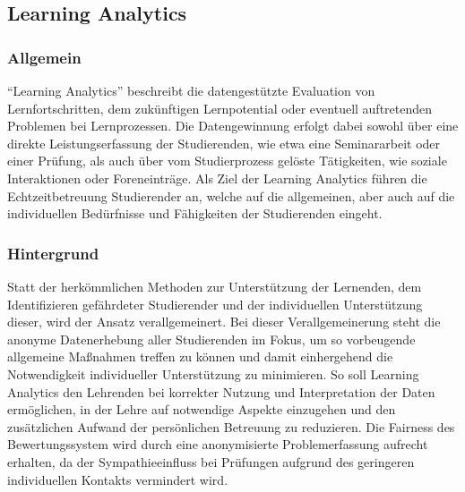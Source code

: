 \subsection{Learning Analytics}

\subsubsection{Allgemein}
\enquote{Learning Analytics} beschreibt die datengestützte Evaluation von Lernfortschritten, dem zukünftigen Lernpotential oder eventuell auftretenden Problemen bei Lernprozessen.
Die Datengewinnung erfolgt dabei sowohl über eine direkte Leistungserfassung der Studierenden, wie etwa eine Seminararbeit oder einer Prüfung, als auch über vom Studierprozess gelöste Tätigkeiten, wie soziale Interaktionen oder Foreneinträge.
Als Ziel der Learning Analytics führen \citeauthor{rf-Johnson2012TheNH} die Echtzeitbetreuung Studierender an, welche auf die allgemeinen, aber auch auf die individuellen Bedürfnisse und Fähigkeiten der Studierenden eingeht.
\autocite{rf-Johnson2012TheNH}

\subsubsection{Hintergrund}
Statt der herkömmlichen Methoden zur Unterstützung der Lernenden, dem Identifizieren gefährdeter Studierender und der individuellen Unterstützung dieser, wird der Ansatz verallgemeinert.
Bei dieser Verallgemeinerung steht die anonyme Datenerhebung aller Studierenden im Fokus, um so vorbeugende allgemeine Maßnahmen treffen zu können und damit einhergehend die Notwendigkeit individueller Unterstützung zu minimieren.
So soll Learning Analytics den Lehrenden bei korrekter Nutzung und Interpretation der Daten ermöglichen, in der Lehre auf notwendige Aspekte einzugehen und den zusätzlichen Aufwand der persönlichen Betreuung zu reduzieren.
Die Fairness des Bewertungssystem wird durch eine anonymisierte Problemerfassung aufrecht erhalten, da der Sympathieeinfluss bei Prüfungen aufgrund des geringeren individuellen Kontakts vermindert wird.


